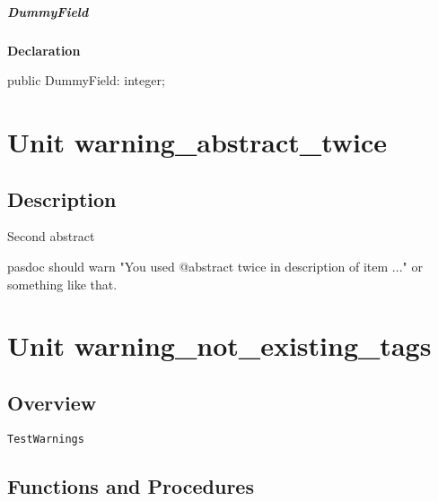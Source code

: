 \documentclass{report}
\begin{document}
\paragraph*{DummyField}\hspace*{\fill}

\begin{list}{}{
\setlength{\itemindent}{0cm}
\setlength{\listparindent}{0cm}
\setlength{\leftmargin}{\evensidemargin}
\addtolength{\leftmargin}{\tmplength}
\settowidth{\labelsep}{X}
\addtolength{\leftmargin}{\labelsep}
\setlength{\labelwidth}{\tmplength}
}
\begin{flushleft}
\item[\textbf{Declaration}\hfill]
\begin{ttfamily}
public DummyField: integer;\end{ttfamily}


\end{flushleft}
\end{list}
\chapter{Unit warning{\_}abstract{\_}twice}
\section{Description}
Second abstract\hfill\vspace*{1ex}





pasdoc should warn "You used @abstract twice in description of item ..." or something like that.
\chapter{Unit warning{\_}not{\_}existing{\_}tags}
\section{Overview}
\begin{description}
\item[\texttt{TestWarnings}]
\end{description}
\section{Functions and Procedures}
\end{document}
